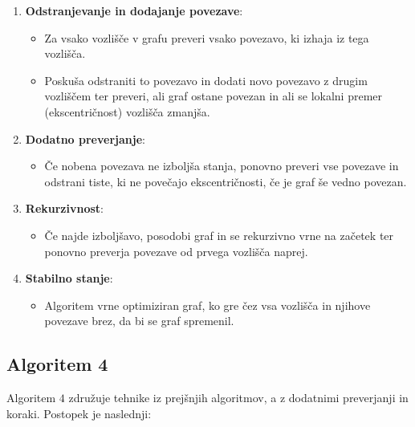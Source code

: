 \documentclass[fin1, tisk]{fmfdelo}
\begin{document}
\begin{enumerate}
    \item \textbf{Odstranjevanje in dodajanje povezave}:
    \begin{itemize}
        \item Za vsako vozlišče v grafu preveri vsako povezavo, ki izhaja iz tega vozlišča.
        \item Poskuša odstraniti to povezavo in dodati novo povezavo z drugim vozliščem ter preveri, ali graf ostane povezan in ali se lokalni premer (ekscentričnost) vozlišča zmanjša.
    \end{itemize}
    
    \item \textbf{Dodatno preverjanje}:
    \begin{itemize}
        \item Če nobena povezava ne izboljša stanja, ponovno preveri vse povezave in odstrani tiste, ki ne povečajo ekscentričnosti, če je graf še vedno povezan.
    \end{itemize}
    
    \item \textbf{Rekurzivnost}:
    \begin{itemize}
        \item Če najde izboljšavo, posodobi graf in se rekurzivno vrne na začetek ter ponovno preverja povezave od prvega vozlišča naprej.
    \end{itemize}
    
    \item \textbf{Stabilno stanje}:
    \begin{itemize}
        \item Algoritem vrne optimiziran graf, ko gre čez vsa vozlišča in njihove povezave brez, da bi se graf spremenil.
    \end{itemize}
\end{enumerate}

\subsection*{Algoritem 4}

Algoritem $4$ združuje tehnike iz prejšnjih algoritmov, a z dodatnimi preverjanji in koraki. Postopek je naslednji:
\end{document}

